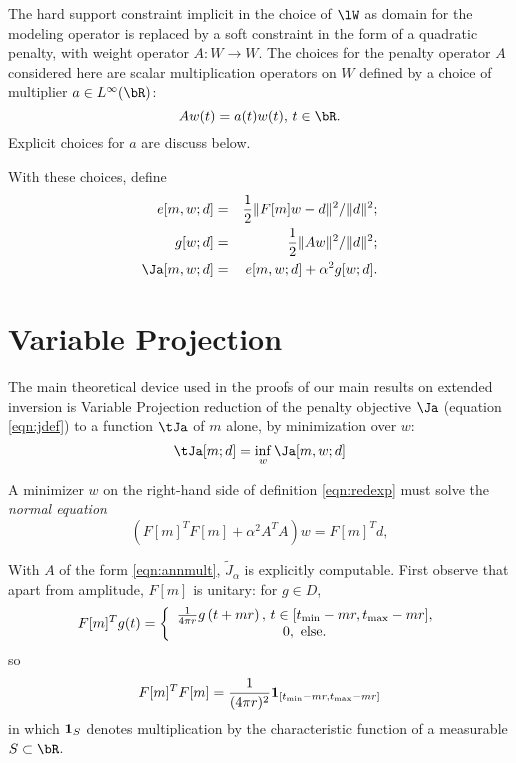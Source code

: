 The hard
support constraint implicit in the choice of $\lW$ as domain for the
modeling operator is replaced by a soft constraint in the form of a
quadratic penalty, with weight operator $A:W \rightarrow W$.
The choices for the penalty operator $A$ considered here are scalar 
multiplication operators on $W$ defined by a choice of multiplier $a \in L^{\infty}(\bR)$:
\begin{equation}
  \label{eqn:annmult}
  A w(t)= a(t)w(t), \, t\in \bR.
\end{equation}
Explicit choices
for $a$ are discuss below.

With these choices, define
\begin{eqnarray}
  \label{eqn:edef}
  e[m,w;d] & = & \frac{1}{2}\|F[m]w-d\|^2/\|d\|^2;\\
  \label{eqn:gdef}
  g[w;d] & = & \frac{1}{2}\|Aw\|^2/\|d\|^2;\\
  \label{eqn:jdef}
  \Ja[m,w;d] & = & e[m,w;d] + \alpha^2g[w;d].
\end{eqnarray}

\section{Variable Projection}
The main theoretical device used in the proofs of our main results on 
extended inversion is Variable Projection reduction of the penalty objective $\Ja$
(equation \ref{eqn:jdef}) to a function $\tJa$ of 
$m$ alone, by minimization over $w$:
\begin{equation}
  \label{eqn:redexp}
  \tJa[m;d] = \inf_w \Ja[m,w;d]
\end{equation}

A minimizer $w$ on the right-hand side of definition
\ref{eqn:redexp} must solve the {\em normal equation}
\begin{equation}
  \label{eqn:norm}
  (F[m]^TF[m]+\alpha^2A^TA)w= F[m]^Td, 
\end{equation}


With $A$ of the form \ref{eqn:annmult}, $\tilde{J}_{\alpha}$ is explicitly
computable. First observe that apart from amplitude, $F[m]$ is
unitary: for $g \in D$,
\begin{equation}
\label{eqn:tran}
F[m]^T g (t) =
\left\{
  \begin{array}{c}
    \frac{1}{4\pi r}g\left(t+mr\right), \, t \in [t_{\rm min}-mr,
    t_{\rm max}-mr],\\
    0, \mbox{ else.}
  \end{array}
\right.
\end{equation}
so
\begin{equation}
  \label{eqn:unit}
  F[m]^TF[m] = \frac{1}{(4\pi r)^2}{\bf 1}_{[t_{\rm min}-mr,  
    t_{\rm max}-mr]}
\end{equation}
in which ${\bf 1}_{S}$ denotes
multiplication by the characteristic function of a measurable 
$S \subset \bR$.

